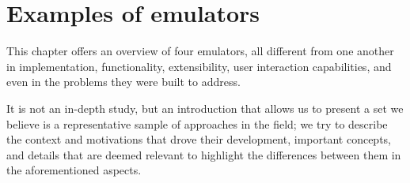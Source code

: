 
\chapter{Examples of emulators}
\label{ch:examplesofemulators}

This chapter offers an overview of four emulators, all different from one another in implementation, functionality, extensibility, user interaction capabilities, and even in the problems they were built to address.

It is not an in-depth study, but an introduction that allows us to present a set we believe is a representative sample of approaches in the field; we try to describe the context and motivations that drove their development, important concepts, and details that are deemed relevant to highlight the differences between them in the aforementioned aspects.











